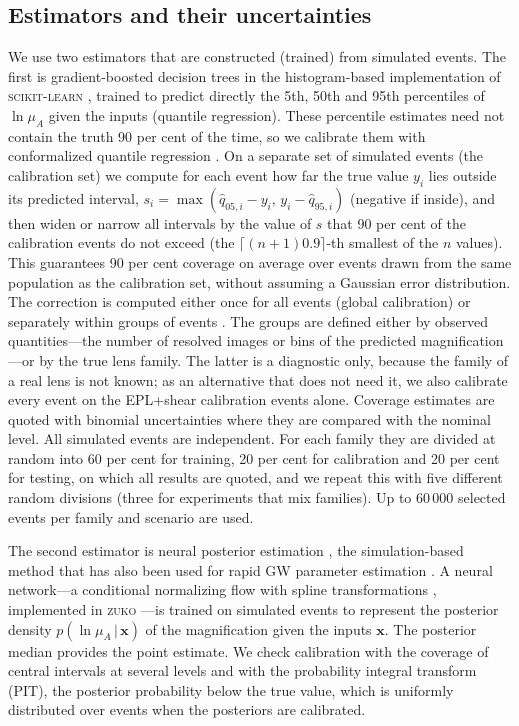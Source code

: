 \subsection{Estimators and their uncertainties}
We use two estimators that are constructed (trained) from simulated events. The first is gradient-boosted decision trees in the histogram-based implementation of \textsc{scikit-learn} \citep[hereafter HistGB;][]{pedregosa2011scikit}, trained to predict directly the 5th, 50th and 95th percentiles of $\ln\mu_A$ given the inputs (quantile regression). These percentile estimates need not contain the truth 90 per cent of the time, so we calibrate them with conformalized quantile regression \citep[CQR;][]{romano2019cqr}. On a separate set of simulated events (the calibration set) we compute for each event how far the true value $y_i$ lies outside its predicted interval, $s_i=\max(\hat q_{05,i}-y_i,\,y_i-\hat q_{95,i})$ (negative if inside), and then widen or narrow all intervals by the value of $s$ that 90 per cent of the calibration events do not exceed (the $\lceil(n+1)0.9\rceil$-th smallest of the $n$ values). This guarantees 90 per cent coverage on average over events drawn from the same population as the calibration set, without assuming a Gaussian error distribution. The correction is computed either once for all events (global calibration) or separately within groups of events \citep{vovk2005algorithmic}. The groups are defined either by observed quantities---the number of resolved images or bins of the predicted magnification---or by the true lens family. The latter is a diagnostic only, because the family of a real lens is not known; as an alternative that does not need it, we also calibrate every event on the EPL+shear calibration events alone. Coverage estimates are quoted with binomial uncertainties where they are compared with the nominal level. All simulated events are independent. For each family they are divided at random into 60 per cent for training, 20 per cent for calibration and 20 per cent for testing, on which all results are quoted, and we repeat this with five different random divisions (three for experiments that mix families). Up to 60\,000 selected events per family and scenario are used.

The second estimator is neural posterior estimation \citep[NPE;][]{papamakarios2016fast}, the simulation-based method that has also been used for rapid GW parameter estimation \citep{dax2021neuralposterior}. A neural network---a conditional normalizing flow with spline transformations \citep{durkan2019nsf}, implemented in \textsc{zuko} \citep{rozet2022zuko}---is trained on simulated events to represent the posterior density $p(\ln\mu_A\,|\,\boldsymbol x)$ of the magnification given the inputs $\boldsymbol x$. The posterior median provides the point estimate. We check calibration with the coverage of central intervals at several levels and with the probability integral transform (PIT), the posterior probability below the true value, which is uniformly distributed over events when the posteriors are calibrated.

